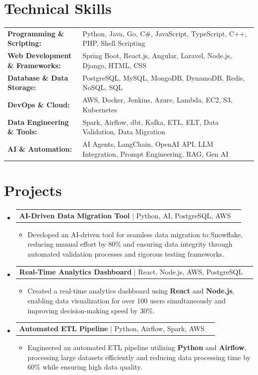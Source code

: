 \documentclass[letterpaper,10pt]{article}
\makeatletter
\newcommand{\resumeItem}[1]{
  \item{\fontsize{8pt}{9pt}\selectfont
    #1 \vspace{-3pt}
  }
}
\newcommand{\resumeProjectHeading}[2]{
    \item
    \begin{tabular*}{1.001\textwidth}{l@{\extracolsep{\fill}}r}
      \fontsize{8.5pt}{10pt}#1 & \textbf{\fontsize{8.5pt}{10pt} #2}\\
    \end{tabular*}\vspace{-7pt}
}
\newcommand{\resumeSubHeadingListStart}{\begin{itemize}[leftmargin=0pt, label={}]}
\newcommand{\resumeSubHeadingListEnd}{\end{itemize}}
\newcommand{\resumeItemListStart}{\begin{itemize}[leftmargin=*]}
\newcommand{\resumeItemListEnd}{\end{itemize}\vspace{-5pt}}
\makeatother
\begin{document}
\section{Technical Skills}
        \vspace{-14pt}
        \begin{table}[h]
            \fontsize{8pt}{9pt}\selectfont
            \begin{tabular}{p{0.3\linewidth} p{0.7\linewidth}}
                \textbf{Programming \& Scripting:} & Python, Java, Go, C\#, JavaScript, TypeScript, C++, PHP, Shell Scripting \\
                \textbf{Web Development \& Frameworks:} & Spring Boot, React.js, Angular, Laravel, Node.js, Django, HTML, CSS \\
                \textbf{Database \& Data Storage:} & PostgreSQL, MySQL, MongoDB, DynamoDB, Redis, NoSQL, SQL \\
                \textbf{DevOps \& Cloud:} & AWS, Docker, Jenkins, Azure, Lambda, EC2, S3, Kubernetes \\
                \textbf{Data Engineering \& Tools:} & Spark, Airflow, dbt, Kafka, ETL, ELT, Data Validation, Data Migration \\
                \textbf{AI \& Automation:} & AI Agents, LangChain, OpenAI API, LLM Integration, Prompt Engineering, RAG, Gen AI \\
            \end{tabular}
        \end{table}
 \vspace{-18pt}

\section{Projects}
    \vspace{-5pt}
    \resumeSubHeadingListStart
          \resumeProjectHeading
            {\textbf{AI-Driven Data Migration Tool} $|$ Python, AI, PostgreSQL, AWS}{}
            \resumeItemListStart
                \resumeItem{Developed an AI-driven tool for seamless data migration to Snowflake, reducing manual effort by 80\% and ensuring data integrity through automated validation processes and rigorous testing frameworks.}
            \resumeItemListEnd
        \vspace{-12pt}
    
        \resumeProjectHeading
            {\textbf{Real-Time Analytics Dashboard} $|$ React, Node.js, AWS, PostgreSQL}{}
        \resumeItemListStart
                \resumeItem{Created a real-time analytics dashboard using \textbf{React} and \textbf{Node.js}, enabling data visualization for over 100 users simultaneously and improving decision-making speed by 30\%.}
        \resumeItemListEnd
      \vspace{-12pt}
      \resumeProjectHeading
        {\textbf{Automated ETL Pipeline} $|$ Python, Airflow, Spark, AWS}{}
    \resumeItemListStart
            \resumeItem{Engineered an automated ETL pipeline utilizing \textbf{Python} and \textbf{Airflow}, processing large datasets efficiently and reducing data processing time by 60\% while ensuring high data quality.}
    \resumeItemListEnd
    \resumeSubHeadingListEnd
\end{document}
